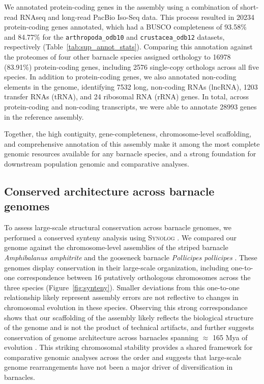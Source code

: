 We annotated protein-coding genes in the \bgla{} assembly using a combination of
short-read RNAseq and long-read PacBio Iso-Seq data.
This process resulted in \num{20234} protein-coding genes annotated, which had a
\textsc{BUSCO} completeness of 93.58\% and 84.77\% for the \texttt{arthropoda\_odb10}
and \texttt{crustacea\_odb12} datasets, respectively (Table~\ref{tab:sup_annot_stats}).
Comparing this annotation against the proteomes of four other barnacle species assigned
orthology to \num{16978} (83.91\%) \bgla{} protein-coding genes, including \num{2576}
single-copy orthologs across all five species.
In addition to protein-coding genes, we also annotated non-coding elements in the
genome, identifying \num{7532} long, non-coding RNAs (lncRNA), \num{1203} transfer RNAs (tRNA),
and 24 ribosomal RNA (rRNA) genes.
In total, across protein-coding and non-coding transcripts, we were able to annotate
\num{28993} genes in the \bgla{} reference assembly.
\vspace{0.1cm}

Together, the high contiguity, gene-completeness, chromosome-level scaffolding,
and comprehensive annotation of this assembly make it among the most complete genomic
resources available for any barnacle species, and a strong foundation for downstream
population genomic and comparative analyses.

\subsection*{Conserved architecture across barnacle genomes}

To assess large-scale structural conservation across barnacle genomes, we performed
a conserved synteny analysis using \textsc{Synolog} \citep{madrigal_synolog_2026}.
We compared our \bgla{} genome against the chromosome-level assemblies of the
striped barnacle \textit{Amphibalanus amphitrite} \citep[Balanidae;][]{han_new_2024}
and the gooseneck barnacle \textit{Pollicipes pollicipes}
\citep[Pollicipedidae;][]{bernot_chromosome-level_2022}.
These genomes display conservation in their large-scale organization, including
one-to-one correspondence between 16 putatively orthologous chromosomes across the
three species (Figure~\ref{fig:synteny}).
Smaller deviations from this one-to-one relationship likely represent assembly errors
are not reflective to changes in chromosomal evolution in these species.
Observing this strong correspondance shows that our scaffolding
of the \bgla{} assembly likely reflects the biological structure of
the genome and is not the product of technical artifacts, and further suggests
conservation of genome architecture across barnacles spanning $\approx$ 165 Mya
of evolution \citep{han_new_2024,bernot_chromosome-level_2022}.
This striking chromosomal stability provides a shared framework for comparative
genomic analyses across the order and suggests that large-scale genome
rearrangements have not been a major driver of diversification in barnacles.


